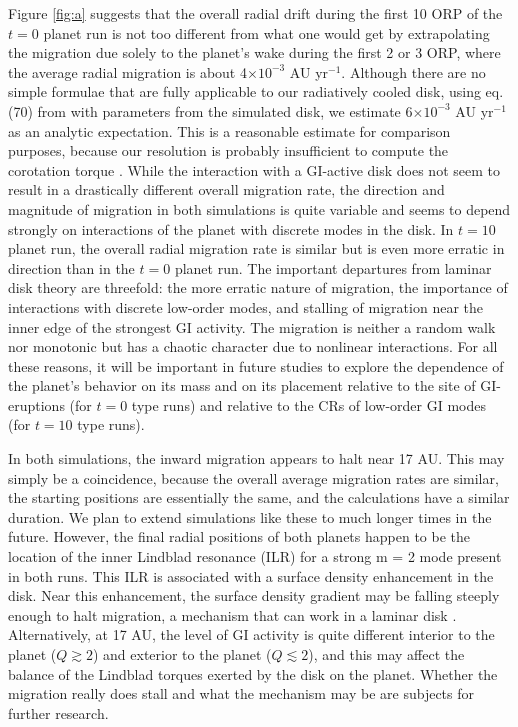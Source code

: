 \documentclass[12pt,manuscript,authoryear]{aastex}
\begin{document}
Figure \ref{fig:a} suggests that the overall radial drift during the first 10 ORP of the $t = 0$ planet run is not too different from what one would get by extrapolating the migration due solely to the planet's wake during the first 2 or 3 ORP, where the average radial migration is about 4$\times10^{-3}$ AU yr$^{-1}$. Although there are no simple formulae that are fully applicable to our radiatively cooled disk, using eq. (70) from \citet{tanaka2002} with parameters from the simulated disk, we estimate 6$\times10^{-3}$ AU yr$^{-1}$ as an analytic expectation. This is a reasonable estimate for comparison purposes, because our resolution is probably insufficient to compute the corotation torque \citep{paardekooper2010}. 
While the interaction with a GI-active disk does not seem to result in a drastically different overall migration rate, the direction and magnitude of migration in both simulations is quite variable and seems to depend strongly on interactions of the planet with discrete modes in the disk. In $t = 10$ planet run, the overall radial migration rate is similar but is even more erratic in direction than in the $t = 0$ planet run. The important departures from laminar disk theory are threefold: the more erratic nature of migration, the importance of interactions with discrete low-order modes, and stalling of migration near the inner edge of the strongest GI activity. The migration is neither a random walk nor monotonic but has a chaotic character due to nonlinear interactions. For all these reasons, it will be important in future studies to explore the dependence of the planet's behavior on its mass and on its placement relative to the site of GI-eruptions (for $t = 0$ type runs) and relative to the CRs of low-order GI modes (for $t = 10$ type runs).

In both simulations, the inward migration appears to halt near 17 AU. This may simply be a coincidence, because the overall average migration rates are similar, the starting positions are essentially the same, and the calculations have a similar duration. We plan to extend simulations like these to much longer times in the future. However, the final radial positions of both planets happen to be the location of the inner Lindblad resonance (ILR) for a strong m = 2 mode present in both runs. This ILR is associated with a surface density enhancement in the disk. Near this enhancement, the surface density gradient may be falling steeply enough to halt migration, a mechanism that can work in a laminar disk \citep{paardekooper2009}. 
Alternatively, at 17 AU, the level of GI activity is quite different interior to the planet ($Q \gtrsim 2$) and exterior to the planet ($Q \lesssim 2$), and this may affect the balance of the Lindblad torques exerted by the disk on the planet. Whether the migration really does stall and what the mechanism may be are subjects for further research.
\end{document}
